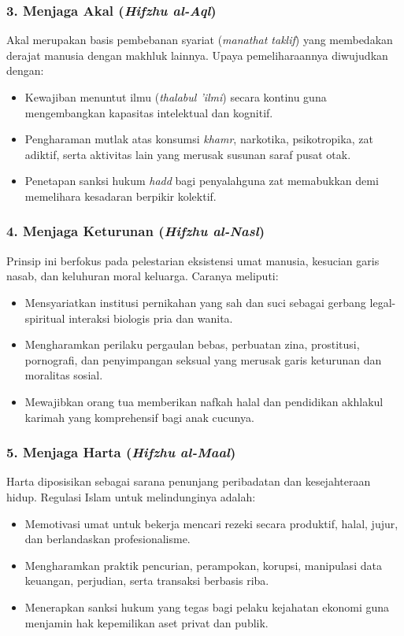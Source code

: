 \documentclass[12pt, a4paper]{article}
\begin{document}
\subsubsection{3. Menjaga Akal (\textit{Hifzhu al-Aql})}
Akal merupakan basis pembebanan syariat (\textit{manathat taklif}) yang membedakan derajat manusia dengan makhluk lainnya. Upaya pemeliharaannya diwujudkan dengan:
\begin{itemize}
    \item Kewajiban menuntut ilmu (\textit{thalabul 'ilmi}) secara kontinu guna mengembangkan kapasitas intelektual dan kognitif.
    \item Pengharaman mutlak atas konsumsi \textit{khamr}, narkotika, psikotropika, zat adiktif, serta aktivitas lain yang merusak susunan saraf pusat otak.
    \item Penetapan sanksi hukum \textit{hadd} bagi penyalahguna zat memabukkan demi memelihara kesadaran berpikir kolektif.
\end{itemize}

\subsubsection{4. Menjaga Keturunan (\textit{Hifzhu al-Nasl})}
Prinsip ini berfokus pada pelestarian eksistensi umat manusia, kesucian garis nasab, dan keluhuran moral keluarga. Caranya meliputi:
\begin{itemize}
    \item Mensyariatkan institusi pernikahan yang sah dan suci sebagai gerbang legal-spiritual interaksi biologis pria dan wanita.
    \item Mengharamkan perilaku pergaulan bebas, perbuatan zina, prostitusi, pornografi, dan penyimpangan seksual yang merusak garis keturunan dan moralitas sosial.
    \item Mewajibkan orang tua memberikan nafkah halal dan pendidikan akhlakul karimah yang komprehensif bagi anak cucunya.
\end{itemize}

\subsubsection{5. Menjaga Harta (\textit{Hifzhu al-Maal})}
Harta diposisikan sebagai sarana penunjang peribadatan dan kesejahteraan hidup. Regulasi Islam untuk melindunginya adalah:
\begin{itemize}
    \item Memotivasi umat untuk bekerja mencari rezeki secara produktif, halal, jujur, dan berlandaskan profesionalisme.
    \item Mengharamkan praktik pencurian, perampokan, korupsi, manipulasi data keuangan, perjudian, serta transaksi berbasis riba.
    \item Menerapkan sanksi hukum yang tegas bagi pelaku kejahatan ekonomi guna menjamin hak kepemilikan aset privat dan publik.
\end{itemize}
\end{document}
